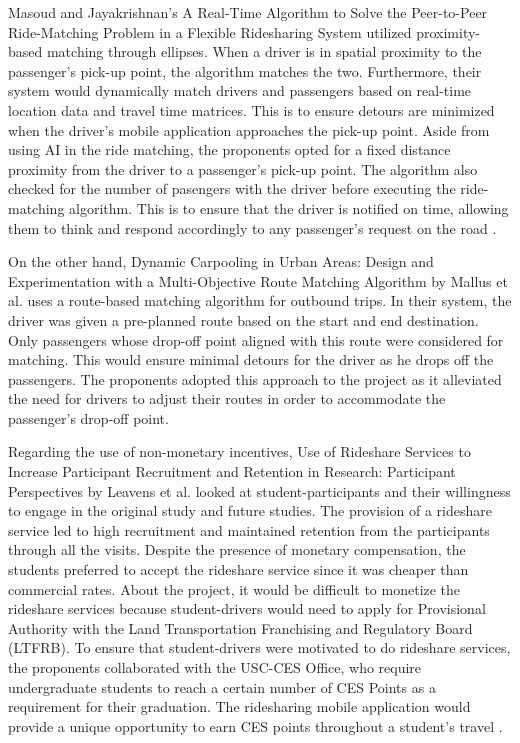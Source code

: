 Masoud and Jayakrishnan’s A Real-Time Algorithm to Solve the Peer-to-Peer Ride-Matching Problem in a Flexible Ridesharing System utilized proximity-based matching through ellipses. When a driver is in spatial proximity to the passenger’s pick-up point, the algorithm matches the two. Furthermore, their system would dynamically match drivers and passengers based on real-time location data and travel time matrices. This is to ensure detours are minimized when the driver's mobile application approaches the pick-up point. Aside from using AI in the ride matching, the proponents opted for a fixed distance proximity from the driver to a passenger’s pick-up point. The algorithm also checked for the number of pasengers with the driver before executing the ride-matching algorithm. This is to ensure that the driver is notified on time, allowing them to think and respond accordingly to any passenger’s request on the road \cite{masoud2017real}.

On the other hand, Dynamic Carpooling in Urban Areas: Design and Experimentation with a Multi-Objective Route Matching Algorithm by Mallus et al. uses a route-based matching algorithm for outbound trips. In their system, the driver was given a pre-planned route based on the start and end destination. Only passengers whose drop-off point aligned with this route were considered for matching. This would ensure minimal detours for the driver as he drops off the passengers. The proponents adopted this approach to the project as it alleviated the need for drivers to adjust their routes in order to accommodate the passenger’s drop-off point\cite{mallus2017dynamic}.

Regarding the use of non-monetary incentives, Use of Rideshare Services to Increase Participant Recruitment and Retention in Research: Participant Perspectives by Leavens et al. looked at student-participants and their willingness to engage in the original study and future studies. The provision of a rideshare service led to high recruitment and maintained retention from the participants through all the visits. Despite the presence of monetary compensation, the students preferred to accept the rideshare service since it was cheaper than commercial rates. About the project, it would be difficult to monetize the rideshare services because student-drivers would need to apply for Provisional Authority with the Land Transportation Franchising and Regulatory Board (LTFRB). To ensure that student-drivers were motivated to do rideshare services, the proponents collaborated with the USC-CES Office, who require undergraduate students to reach a certain number of CES Points as a requirement for their graduation. The ridesharing mobile application would provide a unique opportunity to earn CES points throughout a student’s travel \cite{leavens2019use}.


